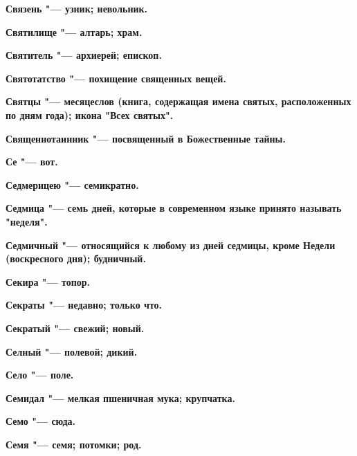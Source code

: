 \bfseries Связень \normalfont{} "--- узник; невольник. 




\bfseries Святилище \normalfont{} "--- алтарь; храм. 




\bfseries Святитель \normalfont{} "--- архиерей; епископ. 




\bfseries Святотатство \normalfont{} "--- похищение священных вещей. 




\bfseries Святцы \normalfont{} "--- месяцеслов (книга, содержащая имена святых, расположенных по дням года); икона "Всех святых". 




\bfseries Священнотаинник \normalfont{} "--- посвященный в Божественные тайны. 




\bfseries Се \normalfont{} "--- вот. 




\bfseries Седмерицею \normalfont{} "--- семикратно. 




\bfseries Седмица \normalfont{} "--- семь дней, которые в современном языке принято называть "неделя". 




\bfseries Седмичный \normalfont{} "--- относящийся к любому из дней седмицы, кроме Недели (воскресного дня); будничный. 




\bfseries Секира \normalfont{} "--- топор. 




\bfseries Секраты \normalfont{} "--- недавно; только что. 




\bfseries Секратый \normalfont{} "--- свежий; новый. 




\bfseries Селный \normalfont{} "--- полевой; дикий. 




\bfseries Село \normalfont{} "--- поле. 




\bfseries Семидал \normalfont{} "--- мелкая пшеничная мука; крупчатка. 




\bfseries Семо \normalfont{} "--- сюда. 




\bfseries Семя \normalfont{} "--- семя; потомки; род. 





